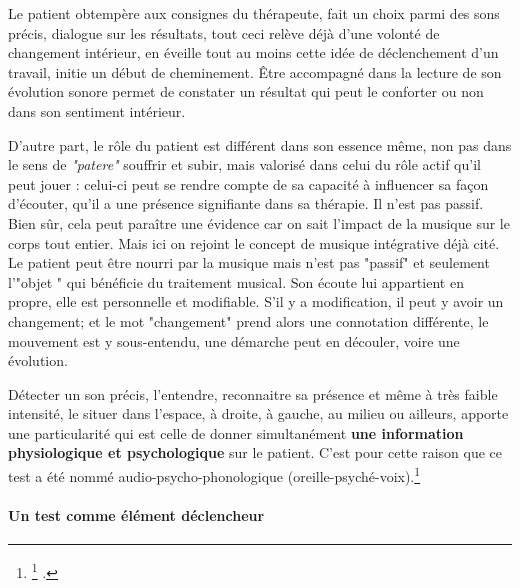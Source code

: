 Le patient obtempère aux consignes du thérapeute, fait un choix parmi des sons précis, dialogue sur les résultats, tout ceci relève déjà d'une volonté de changement intérieur, en  éveille tout au moins cette idée de déclenchement d'un travail, initie un début de cheminement.
Être accompagné dans la lecture de son évolution sonore permet de constater un résultat qui  peut le conforter ou non dans son sentiment intérieur.
	
	D'autre part, le rôle du patient est différent dans son
        essence même, non pas dans le sens de\textit{ "patere"
        }souffrir et subir, mais valorisé dans celui du rôle actif
        qu'il peut jouer : celui-ci peut se rendre compte de sa
        capacité à influencer sa façon d'écouter, qu'il a une présence
        signifiante dans sa thérapie.  Il n'est pas passif. Bien sûr,
        cela peut paraître une évidence car on sait l'impact de la
        musique sur le corps tout entier. Mais ici on rejoint  le
        concept de musique intégrative déjà cité\autocite[Cf.] {vrait_musicotherapie_2018}. Le patient peut être nourri par la musique mais n'est pas "passif" et seulement l'"objet " qui bénéficie du traitement musical. Son  écoute lui appartient en propre, elle est personnelle et modifiable. S'il y a modification, il peut y avoir un changement; et le mot "changement" prend alors une connotation différente,  le mouvement est y  sous-entendu,  une démarche peut en découler, voire une évolution. 



 Détecter un son précis, l'entendre, reconnaitre sa présence et même à très
 faible intensité, le situer dans l'espace, à droite, à gauche, au
 milieu ou ailleurs,  apporte une particularité qui est celle de  donner simultanément  \textbf{une information
   physiologique et psychologique} sur le patient.
 C'est pour cette raison que ce test a été nommé
 audio-psycho-phonologique (oreille-psyché-voix).\footnote{\footnote{Avec le professeur Tomatis: formation suivie dès 1995, Boulevard de Courcelles, Centre de l'écoute 
Tomatis à Paris; puis en 2009/11/13/15 avec V. Gas, V. Drouot et J.P. Granier, formateurs et consultants. Source: site internet officiel: \cite{tomatis.com}.}
.}
   
        
\paragraph{Un test comme élément déclencheur}

